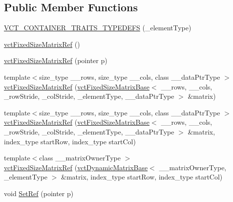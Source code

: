 \subsection*{Public Member Functions}
\begin{DoxyCompactItemize}
\item 
\hyperlink{classvct_fixed_size_matrix_ref_a60ff4f7afb7d9ab64532a0bdc1b79643}{V\+C\+T\+\_\+\+C\+O\+N\+T\+A\+I\+N\+E\+R\+\_\+\+T\+R\+A\+I\+T\+S\+\_\+\+T\+Y\+P\+E\+D\+E\+F\+S} (\+\_\+element\+Type)
\item 
\hyperlink{classvct_fixed_size_matrix_ref_a71f82d9a9b48de55cc1b82ce4388de9f}{vct\+Fixed\+Size\+Matrix\+Ref} ()
\item 
\hyperlink{classvct_fixed_size_matrix_ref_a376fb099bf980271a9b419950a35cd14}{vct\+Fixed\+Size\+Matrix\+Ref} (pointer p)
\item 
{\footnotesize template$<$size\+\_\+type \+\_\+\+\_\+rows, size\+\_\+type \+\_\+\+\_\+cols, class \+\_\+\+\_\+data\+Ptr\+Type $>$ }\\\hyperlink{classvct_fixed_size_matrix_ref_a5e367177e08e21d5f8a67ff8c64e1123}{vct\+Fixed\+Size\+Matrix\+Ref} (\hyperlink{classvct_fixed_size_matrix_base}{vct\+Fixed\+Size\+Matrix\+Base}$<$ \+\_\+\+\_\+rows, \+\_\+\+\_\+cols, \+\_\+row\+Stride, \+\_\+col\+Stride, \+\_\+element\+Type, \+\_\+\+\_\+data\+Ptr\+Type $>$ \&matrix)
\item 
{\footnotesize template$<$size\+\_\+type \+\_\+\+\_\+rows, size\+\_\+type \+\_\+\+\_\+cols, class \+\_\+\+\_\+data\+Ptr\+Type $>$ }\\\hyperlink{classvct_fixed_size_matrix_ref_a4f298a0a0d6352ae3ccc4589f885902c}{vct\+Fixed\+Size\+Matrix\+Ref} (\hyperlink{classvct_fixed_size_matrix_base}{vct\+Fixed\+Size\+Matrix\+Base}$<$ \+\_\+\+\_\+rows, \+\_\+\+\_\+cols, \+\_\+row\+Stride, \+\_\+col\+Stride, \+\_\+element\+Type, \+\_\+\+\_\+data\+Ptr\+Type $>$ \&matrix, index\+\_\+type start\+Row, index\+\_\+type start\+Col)
\item 
{\footnotesize template$<$class \+\_\+\+\_\+matrix\+Owner\+Type $>$ }\\\hyperlink{classvct_fixed_size_matrix_ref_a1f2a473bd11829f1c76601a0e9617f54}{vct\+Fixed\+Size\+Matrix\+Ref} (\hyperlink{classvct_dynamic_matrix_base}{vct\+Dynamic\+Matrix\+Base}$<$ \+\_\+\+\_\+matrix\+Owner\+Type, \+\_\+element\+Type $>$ \&matrix, index\+\_\+type start\+Row, index\+\_\+type start\+Col)
\item 
void \hyperlink{classvct_fixed_size_matrix_ref_af786a2ba2f39a269bbebd1284bc0a3a7}{Set\+Ref} (pointer p)
\item 

\end{DoxyCompactItemize}
